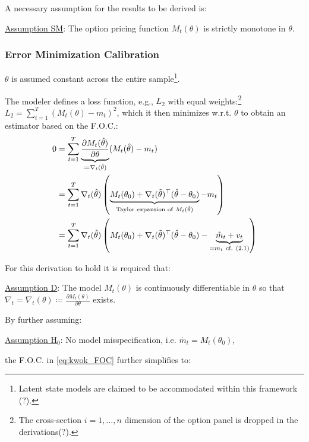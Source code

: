 \documentclass[11pt,a4paper,notitlepage]{article}
\numberwithin{equation}{section}
\begin{document}
A necessary assumption for the results to be derived is: 
\begin{adjustwidth}{30 pt}{0 pt}
\underline{Assumption SM}: The option pricing function $M_t(\theta)$ is strictly monotone in $\theta$. 
\end{adjustwidth}

\subsubsection*{Error Minimization Calibration}
$\theta$ is assumed constant across the entire sample\footnote{Latent state models are claimed to be accommodated within this framework (?).}. 

The modeler defines a loss function, e.g., $L_2$ with equal weights:\footnote{The cross-section $i=1,\dots,n$ dimension of the option panel is dropped in the derivations(?).} $L_2=\sum_{t=1}^T (M_t(\theta)-m_t)^2$, which it then minimizes w.r.t. $\theta$ to obtain an estimator based on the F.O.C.:
\begin{align}
0&=\sum\limits_{t=1}^T\underbrace{\frac{\partial M_t(\hat{\theta})}{\partial \theta}}_{\coloneqq \nabla_t(\hat{\theta})} (M_t(\hat{\theta})-m_t)\notag\\
&= \sum\limits_{t=1}^T \nabla_t(\hat{\theta}) \left(\underbrace{M_t(\theta_0)+\nabla_t(\tilde{\theta})^\top(\hat{\theta}-\theta_0)}_{\text{Taylor expansion of}~M_t(\hat{\theta})}-m_t\right)\notag\\
&= \sum\limits_{t=1}^T \nabla_t(\hat{\theta}) \left(M_t(\theta_0)+\nabla_t(\tilde{\theta})^\top(\hat{\theta}-\theta_0)-\underbrace{\mathring{m}_t+v_t}_{= m_t~\text{cf. (2.1)}}\right)
\label{eq:kwok_FOC}
\end{align}

For this derivation to hold it is required that:
\begin{adjustwidth}{30 pt}{0 pt}
\underline{Assumption D}: The model $M_t(\theta)$ is continuously differentiable in $\theta$ so that $\nabla_t=\nabla_t(\theta)\coloneqq\frac{\partial M_t(\theta)}{\partial \theta}$ exists. 
\end{adjustwidth}

By further assuming: 
\begin{adjustwidth}{30 pt}{0 pt}
\underline{Assumption H$_0$}: No model misspecification, i.e. $\mathring{m_t}=M_t(\theta_0)$,
\end{adjustwidth}

the F.O.C. in \eqref{eq:kwok_FOC} further simplifies to:
\end{document}

